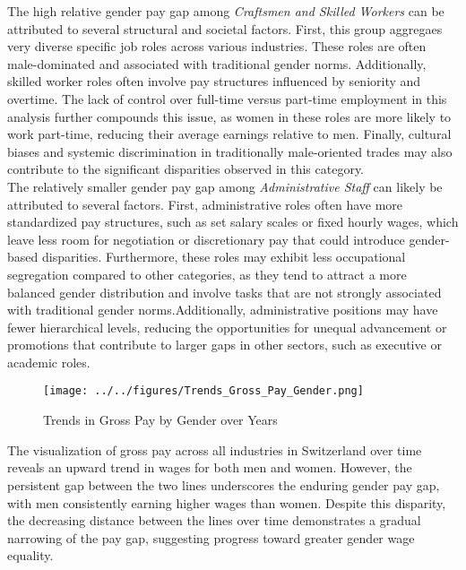 \documentclass{article}
\begin{document}
The high relative gender pay gap among \textit{Craftsmen and Skilled Workers} can be attributed to several structural and societal factors. First, this group aggregaes very diverse specific job roles across various industries. These roles are often male-dominated and associated with traditional gender norms. Additionally, skilled worker roles often involve pay structures influenced by seniority and overtime. The lack of control over full-time versus part-time employment in this analysis further compounds this issue, as women in these roles are more likely to work part-time, reducing their average earnings relative to men. Finally, cultural biases and systemic discrimination in traditionally male-oriented trades may also contribute to the significant disparities observed in this category.\\

The relatively smaller gender pay gap among \textit{Administrative Staff} can likely be attributed to several factors. First, administrative roles often have more standardized pay structures, such as set salary scales or fixed hourly wages, which leave less room for negotiation or discretionary pay that could introduce gender-based disparities. Furthermore, these roles may exhibit less occupational segregation compared to other categories, as they tend to attract a more balanced gender distribution and involve tasks that are not strongly associated with traditional gender norms.Additionally, administrative positions may have fewer hierarchical levels, reducing the opportunities for unequal advancement or promotions that contribute to larger gaps in other sectors, such as executive or academic roles. \\


\begin{figure}[h]
    \centering
    \texttt{[image: ../../figures/Trends\_Gross\_Pay\_Gender.png]}
    \caption{Trends in Gross Pay by Gender over Years}
    \label{fig:rates_time}
\end{figure}

The visualization of gross pay across all industries in Switzerland over time reveals an upward trend in wages for both men and women. However, the persistent gap between the two lines underscores the enduring gender pay gap, with men consistently earning higher wages than women. Despite this disparity, the decreasing distance between the lines over time demonstrates a gradual narrowing of the pay gap, suggesting progress toward greater gender wage equality.\\
\end{document}
